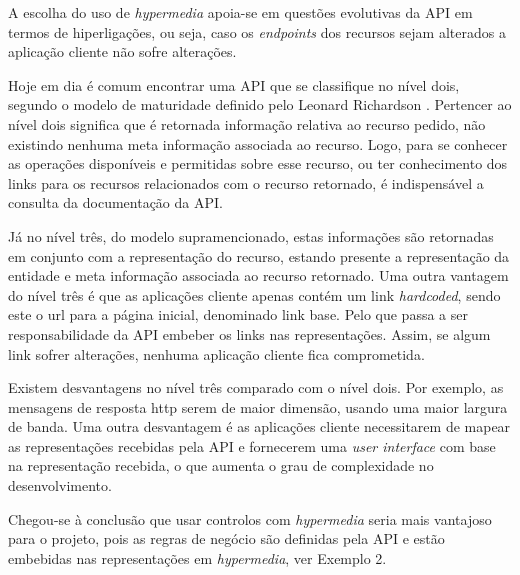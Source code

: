 A escolha do uso de \textit{hypermedia} apoia-se em questões evolutivas da API em termos de hiperligações, ou seja, caso os \textit{endpoints} dos recursos sejam alterados a aplicação cliente não sofre alterações.

Hoje em dia é comum encontrar uma API que se classifique no nível dois, segundo o modelo de maturidade definido pelo Leonard Richardson \cite{RichardsonMaturityModel:martinFowler}. Pertencer ao nível dois significa que é retornada informação relativa ao recurso pedido, não existindo nenhuma meta informação associada ao recurso. Logo, para se conhecer as operações disponíveis e permitidas sobre esse recurso, ou ter conhecimento dos links para os recursos relacionados com o recurso retornado, é indispensável a consulta da documentação da API. 

Já no nível três, do modelo supramencionado, estas informações são retornadas em conjunto com a representação do recurso, estando presente a representação da entidade e meta informação associada ao recurso retornado. Uma outra vantagem do nível três é que as aplicações cliente apenas contém um link \textit{hardcoded}, sendo este o \acrfull{url} para a página inicial, denominado link base. Pelo que passa a ser responsabilidade da API embeber os links nas representações. Assim, se algum link sofrer alterações, nenhuma aplicação cliente fica comprometida.

Existem desvantagens no nível três comparado com o nível dois. Por exemplo, as mensagens de resposta \acrshort{http} serem de maior dimensão, usando uma maior largura de banda. Uma outra desvantagem é as aplicações cliente necessitarem de mapear as representações recebidas pela API e fornecerem uma \textit{user interface} com base na representação recebida, o que aumenta o grau de complexidade no desenvolvimento.

Chegou-se à conclusão que usar controlos com \textit{hypermedia} seria mais vantajoso para o projeto, pois as regras de negócio são definidas pela API e estão embebidas nas representações em \textit{hypermedia}, ver Exemplo 2.\\

